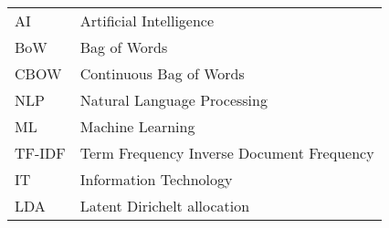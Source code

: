 \begin{longtable}{ll}

AI & Artificial Intelligence \\
BoW & Bag of Words \\
CBOW & Continuous Bag of Words \\
NLP & Natural Language Processing \\
ML & Machine Learning \\
TF-IDF & Term Frequency Inverse Document Frequency \\
IT & Information Technology \\
LDA & Latent Dirichelt allocation \\


\end{longtable}

